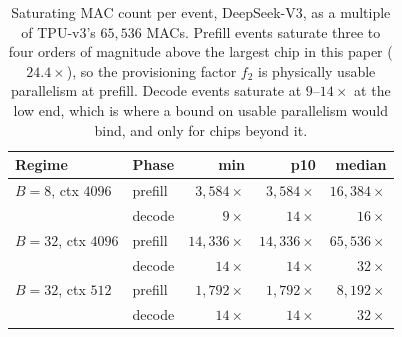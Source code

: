 \begin{table}[ht!]
\centering
\small
\caption{Saturating MAC count per event, DeepSeek-V3, as a multiple of
TPU-v3's $65{,}536$ MACs. Prefill events saturate three to four orders of
magnitude above the largest chip in this paper ($24.4\times$), so the
provisioning factor $f_2$ is physically usable parallelism at prefill. Decode
events saturate at $9$--$14\times$ at the low end, which is where a bound on
usable parallelism would bind, and only for chips beyond it.}
\label{tab:msat}
\begin{tabular}{@{}llrrr@{}}
\toprule
Regime & Phase & min & p10 & median \\
\midrule
$B{=}8$, ctx $4096$   & prefill & $3{,}584\times$  & $3{,}584\times$  & $16{,}384\times$ \\
                      & decode  & $9\times$        & $14\times$       & $16\times$ \\
$B{=}32$, ctx $4096$  & prefill & $14{,}336\times$ & $14{,}336\times$ & $65{,}536\times$ \\
                      & decode  & $14\times$       & $14\times$       & $32\times$ \\
$B{=}32$, ctx $512$   & prefill & $1{,}792\times$  & $1{,}792\times$  & $8{,}192\times$ \\
                      & decode  & $14\times$       & $14\times$       & $32\times$ \\
\bottomrule
\end{tabular}
\end{table}

